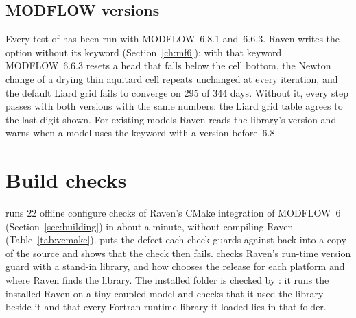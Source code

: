 \subsection{MODFLOW versions}\label{sec:mf6versions}
Every test of  has been run with MODFLOW~6.8.1 and~6.6.3. Raven writes the  option
without its  keyword (Section~\ref{ch:mf6}): with that keyword MODFLOW~6.6.3 resets a head that falls
below the cell bottom, the Newton change of a drying thin aquitard cell repeats unchanged at every iteration, and the default
Liard grid fails to converge on 295 of 344 days. Without it, every step passes with both versions with the same numbers: the
Liard grid table agrees to the last digit shown. For existing models Raven reads the library's version and warns when a model
uses the keyword with a version before~6.8.




\section{Build checks}\label{sec:vbuild}
 runs 22 offline configure checks of Raven's CMake integration of MODFLOW~6
(Section~\ref{sec:building}) in about a minute, without compiling Raven (Table~\ref{tab:vcmake}).  puts
the defect each check guards against back into a copy of the source and shows that the check then fails.
 checks Raven's run-time version guard with a stand-in library, and
 how  chooses the release for each platform and where Raven finds the
library. The installed folder is checked by : it runs the installed Raven on a tiny coupled
model and checks that it used the library beside it and that every Fortran runtime library it loaded lies in that folder.

